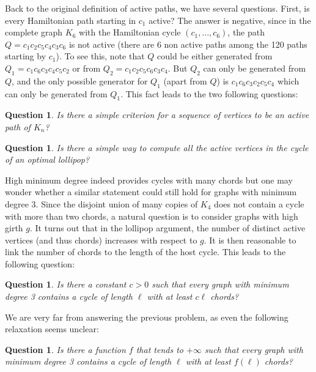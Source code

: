 \documentclass[11pt]{article}
\newtheorem{ques}[theo]{Question}
\begin{document}
Back to the original definition of active paths, we have several questions. First, is every Hamiltonian path starting in $c_1$ active? The answer is negative, since in the complete graph $K_6$ with the Hamiltonian cycle $(c_1,\dots ,c_6)$, the path $Q=c_1c_2c_5c_4c_3c_6$ is not active (there are 6 non active paths among the 120 paths starting by $c_1$). To see this, note that $Q$ could be either generated from $Q_1=c_1c_6c_3c_4c_5c_2$ or from $Q_2=c_1c_2c_5c_6c_3c_4$. But $Q_2$ can only be generated from $Q$, and the only possible generator for $Q_1$ (apart from $Q$) is $c_1c_6c_3c_2c_5c_4$ which can only be generated from $Q_1$. This fact leads to the two following questions:


\begin{ques}
Is there a simple criterion for a sequence of vertices to be an active path of $K_n$? 
\end{ques}

\begin{ques}
Is there a simple way to compute all the active vertices in the cycle of an optimal lollipop? 
\end{ques}




High minimum degree indeed provides cycles with many chords but one may wonder whether a similar statement could still hold for graphs with minimum degree 3. Since the disjoint union of many copies of $K_4$ does not contain a cycle with more than two chords, a natural question is to consider graphs with high girth $g$. It turns out that in the lollipop argument, the number of distinct active vertices (and thus chords) increases with respect to $g$. It is then reasonable to link the number of chords to the length of the host cycle. This leads to the following question:


\begin{ques} 
Is there a constant $c>0$ such that every graph with minimum degree 3 contains a cycle of length $\ell$ with at least $c \ell$ chords? 
\end{ques}

We are very far from answering the previous problem, as even the following relaxation seems unclear:

\begin{ques}
Is there a function $f$ that tends to $+\infty$ such that every graph with minimum degree 3 contains a cycle of length $\ell$ with at least $f(\ell)$ chords?
\end{ques}
\end{document}
